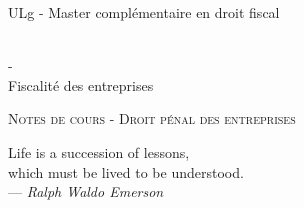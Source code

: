 \documentclass{book}
\begin{document}
\sffamily
\newcommand{\RPoint}{\protect\texttt{[image: point.png]}}
\newcommand{\RSave}{\protect\texttt{[image: Save.png]}}
\renewcommand\labelitemii{\ding{220}}
\begin{titlepage}

\begin{center}
\begin{Large}ULg - Master complémentaire en droit fiscal\end{Large}\\
\vspace{0.5cm}- \\
\vspace{0.5cm}
Fiscalité des entreprises

\end{center}
\vspace{6cm}

\LARGE
\begin{center}
\textsc{Notes de cours - Droit pénal des entreprises}\\
\end{center}

\vspace{10.0cm}

\normalsize
{}

\end{titlepage}

\newpage

\thispagestyle{empty}
\setcounter{page}{0}
\null

\newpage
\thispagestyle{empty}
\setcounter{page}{0}
\vspace{20cm}

\vfill
\begin{flushright}
Life is a succession of lessons, \\
which must be lived to be understood. \\ 
--- \textit{Ralph Waldo Emerson}
\end{flushright}
\vfill
\newpage

\renewcommand{\chaptermark}[1]{\markboth{#1}{}}
\renewcommand{\sectionmark}[1]{\markright{\thesection\ #1}}
\fancyhf{} \fancyhead[LE,RO]{\bfseries\thepage}
\fancyhead[LO]{\bfseries\rightmark}
\fancyhead[RE]{\bfseries\leftmark}
\renewcommand{\headrulewidth}{0.5pt}
\addtolength{\headheight}{0.5pt}
\renewcommand{\footrulewidth}{0pt}
\fancypagestyle{plain}{ \fancyhead{}
\renewcommand{\headrulewidth}{0pt}}
\end{document}
